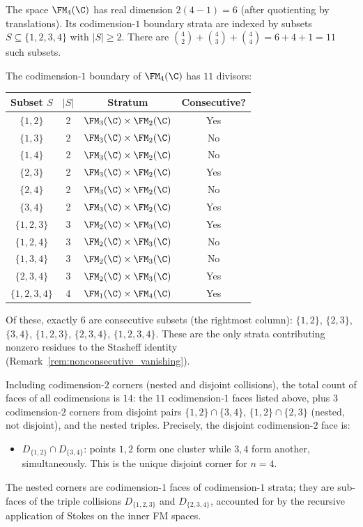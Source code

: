 The space $\FM_4(\C)$ has real dimension $2(4-1) = 6$ (after
quotienting by translations). Its codimension-$1$ boundary
strata are indexed by subsets $S \subseteq \{1,2,3,4\}$ with
$|S| \ge 2$. There are $\binom{4}{2} + \binom{4}{3} +
\binom{4}{4} = 6 + 4 + 1 = 11$ such subsets.

\begin{proposition}
The codimension-$1$ boundary of $\FM_4(\C)$ has $11$
divisors:
\begin{center}
\renewcommand{\arraystretch}{1.2}
\begin{tabular}{c|c|c|c}
\textbf{Subset $S$} & \textbf{$|S|$} & \textbf{Stratum}
 & \textbf{Consecutive?} \\
\hline
$\{1,2\}$ & 2 & $\FM_3(\C) \times \FM_2(\C)$ & Yes \\
$\{1,3\}$ & 2 & $\FM_3(\C) \times \FM_2(\C)$ & No \\
$\{1,4\}$ & 2 & $\FM_3(\C) \times \FM_2(\C)$ & No \\
$\{2,3\}$ & 2 & $\FM_3(\C) \times \FM_2(\C)$ & Yes \\
$\{2,4\}$ & 2 & $\FM_3(\C) \times \FM_2(\C)$ & No \\
$\{3,4\}$ & 2 & $\FM_3(\C) \times \FM_2(\C)$ & Yes \\
$\{1,2,3\}$ & 3 & $\FM_2(\C) \times \FM_3(\C)$ & Yes \\
$\{1,2,4\}$ & 3 & $\FM_2(\C) \times \FM_3(\C)$ & No \\
$\{1,3,4\}$ & 3 & $\FM_2(\C) \times \FM_3(\C)$ & No \\
$\{2,3,4\}$ & 3 & $\FM_2(\C) \times \FM_3(\C)$ & Yes \\
$\{1,2,3,4\}$ & 4 & $\FM_1(\C) \times \FM_4(\C)$ & Yes
\end{tabular}
\end{center}
Of these, exactly $6$ are consecutive subsets (the rightmost
column): $\{1,2\}$, $\{2,3\}$, $\{3,4\}$, $\{1,2,3\}$,
$\{2,3,4\}$, $\{1,2,3,4\}$. These are the only strata
contributing nonzero residues to the Stasheff identity
(Remark~\ref{rem:nonconsecutive_vanishing}).

Including codimension-$2$ corners (nested and disjoint
collisions), the total count of faces of all codimensions is
$14$: the $11$ codimension-$1$ faces listed above, plus $3$
codimension-$2$ corners from disjoint pairs
$\{1,2\} \cap \{3,4\}$, $\{1,2\} \cap \{2,3\}$ (nested, not
disjoint), and the nested triples. Precisely, the disjoint
codimension-$2$ face is:
\begin{itemize}
\item $D_{\{1,2\}} \cap D_{\{3,4\}}$: points $1,2$ form one
 cluster while $3,4$ form another, simultaneously.
 This is the unique disjoint corner for $n = 4$.
\end{itemize}
The nested corners are codimension-$1$ faces of
codimension-$1$ strata; they are sub-faces of the triple
collisions $D_{\{1,2,3\}}$ and $D_{\{2,3,4\}}$, accounted
for by the recursive application of Stokes on the inner FM
spaces.
\end{proposition}

